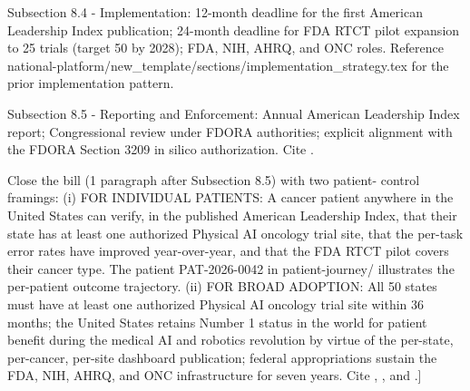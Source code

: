 Subsection 8.4 - Implementation: 12-month deadline for the first
American Leadership Index publication; 24-month deadline for FDA
RTCT pilot expansion to 25 trials (target 50 by 2028); FDA, NIH,
AHRQ, and ONC roles. Reference
national-platform/new\_template/sections/implementation\_strategy.tex
for the prior implementation pattern.

Subsection 8.5 - Reporting and Enforcement: Annual American
Leadership Index report; Congressional review under FDORA
authorities; explicit alignment with the FDORA Section 3209 in silico
authorization. Cite \cite{rank4_fdora_fda_modernization_2022}.

Close the bill (1 paragraph after Subsection 8.5) with two patient-
control framings:
(i) FOR INDIVIDUAL PATIENTS: A cancer patient anywhere in the United
    States can verify, in the published American Leadership Index,
    that their state has at least one authorized Physical AI
    oncology trial site, that the per-task error rates have improved
    year-over-year, and that the FDA RTCT pilot covers their cancer
    type. The patient PAT-2026-0042 in patient-journey/ illustrates
    the per-patient outcome trajectory.
(ii) FOR BROAD ADOPTION: All 50 states must have at least one
     authorized Physical AI oncology trial site within 36 months;
     the United States retains Number 1 status in the world for
     patient benefit during the medical AI and robotics revolution
     by virtue of the per-state, per-cancer, per-site dashboard
     publication; federal appropriations sustain the FDA, NIH,
     AHRQ, and ONC infrastructure for seven years. Cite
     \cite{kawchak_2026_19244918}, \cite{kawchak_2026_19994945},
     and \cite{kawchak_2026_19396256}.]
